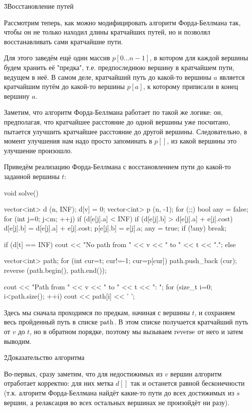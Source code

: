 \h3{Восстановление путей}

Рассмотрим теперь, как можно модифицировать алгоритм Форда-Беллмана так, чтобы он не только находил длины кратчайших путей, но и позволял восстанавливать сами кратчайшие пути.

Для этого заведём ещё один массив $p[0 \ldots n-1]$, в котором для каждой вершины будем хранить её "предка", т.е. предпоследнюю вершину в кратчайшем пути, ведущем в неё. В самом деле, кратчайший путь до какой-то вершины $a$ является кратчайшим путём до какой-то вершины $p[a]$, к которому приписали в конец вершину $a$.

Заметим, что алгоритм Форда-Беллмана работает по такой же логике: он, предполагая, что кратчайшее расстояние до одной вершины уже посчитано, пытается улучшить кратчайшее расстояние до другой вершины. Следовательно, в момент улучшения нам надо просто запоминать в $p[]$, из какой вершины это улучшение произошло.

Приведём реализацию Форда-Беллмана с восстановлением пути до какой-то заданной вершины $t$:

\code
void solve() {
	vector<int> d (n, INF);
	d[v] = 0;
	vector<int> p (n, -1);
	for (;;) {
		bool any = false;
		for (int j=0; j<m; ++j)
			if (d[e[j].a] < INF)
				if (d[e[j].b] > d[e[j].a] + e[j].cost) {
					d[e[j].b] = d[e[j].a] + e[j].cost;
					p[e[j].b] = e[j].a;
					any = true;
				}
		if (!any)  break;
	}

	if (d[t] == INF)
		cout << "No path from " << v << " to " << t << ".";
	else {
		vector<int> path;
		for (int cur=t; cur!=-1; cur=p[cur])
			path.push_back (cur);
		reverse (path.begin(), path.end());

		cout << "Path from " << v << " to " << t << ": ";
		for (size_t i=0; i<path.size(); ++i)
			cout << path[i] << ' ';
	}
}
\endcode

Здесь мы сначала проходимся по предкам, начиная с вершины $t$, и сохраняем весь пройденный путь в списке $\rm path$. В этом списке получается кратчайший путь от $v$ до $t$, но в обратном порядке, поэтому мы вызываем $\rm reverse$ от него и затем выводим.


\h2{Доказательство алгоритма}

Во-первых, сразу заметим, что для недостижимых из $v$ вершин алгоритм отработает корректно: для них метка $d[]$ так и останется равной бесконечности (т.к. алгоритм Форда-Беллмана найдёт какие-то пути до всех достижимых из $s$ вершин, а релаксация во всех остальных вершинах не произойдёт ни разу).

